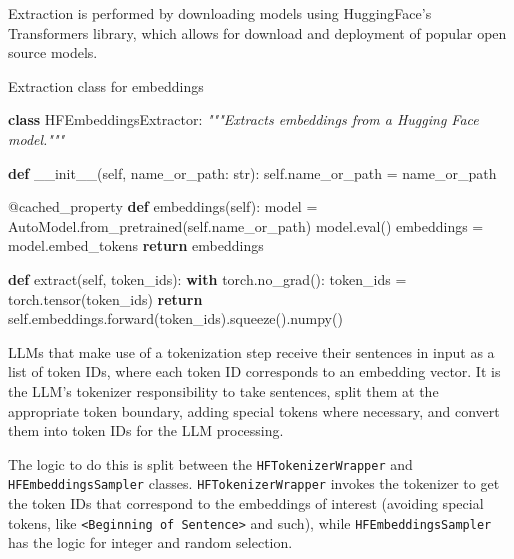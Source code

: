 \documentclass[
  a4paper, twoside, 10pt, titlepage]{book}
\newenvironment{Shaded}{}{}
\newcommand{\AttributeTok}[1]{\textcolor[rgb]{0.49,0.56,0.16}{#1}}
\newcommand{\BuiltInTok}[1]{\textcolor[rgb]{0.00,0.50,0.00}{#1}}
\newcommand{\CommentTok}[1]{\textcolor[rgb]{0.38,0.63,0.69}{\textit{#1}}}
\newcommand{\ControlFlowTok}[1]{\textcolor[rgb]{0.00,0.44,0.13}{\textbf{#1}}}
\newcommand{\FunctionTok}[1]{\textcolor[rgb]{0.02,0.16,0.49}{#1}}
\newcommand{\KeywordTok}[1]{\textcolor[rgb]{0.00,0.44,0.13}{\textbf{#1}}}
\newcommand{\NormalTok}[1]{#1}
\newcommand{\OperatorTok}[1]{\textcolor[rgb]{0.40,0.40,0.40}{#1}}
\newcommand{\VariableTok}[1]{\textcolor[rgb]{0.10,0.09,0.49}{#1}}
\begin{document}
Extraction is performed by downloading models using HuggingFace's
Transformers library, which allows for download and deployment of
popular open source models.

\begin{codelisting}

\caption{Extraction class for embeddings}\label{lst:extractor}

\begin{Shaded}
\begin{Highlighting}[]
\KeywordTok{class}\NormalTok{ HFEmbeddingsExtractor:}
    \CommentTok{"""Extracts embeddings from a Hugging Face model."""}

    \KeywordTok{def} \FunctionTok{\_\_init\_\_}\NormalTok{(}\VariableTok{self}\NormalTok{, name\_or\_path: }\BuiltInTok{str}\NormalTok{):}
        \VariableTok{self}\NormalTok{.name\_or\_path }\OperatorTok{=}\NormalTok{ name\_or\_path}

    \AttributeTok{@cached\_property}
    \KeywordTok{def}\NormalTok{ embeddings(}\VariableTok{self}\NormalTok{):}
\NormalTok{        model }\OperatorTok{=}\NormalTok{ AutoModel.from\_pretrained(}\VariableTok{self}\NormalTok{.name\_or\_path)}
\NormalTok{        model.}\BuiltInTok{eval}\NormalTok{()}
\NormalTok{        embeddings }\OperatorTok{=}\NormalTok{ model.embed\_tokens}
        \ControlFlowTok{return}\NormalTok{ embeddings}

    \KeywordTok{def}\NormalTok{ extract(}\VariableTok{self}\NormalTok{, token\_ids):}
        \ControlFlowTok{with}\NormalTok{ torch.no\_grad():}
\NormalTok{            token\_ids }\OperatorTok{=}\NormalTok{ torch.tensor(token\_ids)}
            \ControlFlowTok{return} \VariableTok{self}\NormalTok{.embeddings.forward(token\_ids).squeeze().numpy()}
\end{Highlighting}
\end{Shaded}

\end{codelisting}

LLMs that make use of a tokenization step receive their sentences in
input as a list of token IDs, where each token ID corresponds to an
embedding vector. It is the LLM's tokenizer responsibility to take
sentences, split them at the appropriate token boundary, adding special
tokens where necessary, and convert them into token IDs for the LLM
processing.

The logic to do this is split between the \texttt{HFTokenizerWrapper}
and \texttt{HFEmbeddingsSampler} classes. \texttt{HFTokenizerWrapper}
invokes the tokenizer to get the token IDs that correspond to the
embeddings of interest (avoiding special tokens, like
\texttt{\textless{}Beginning\ of\ Sentence\textgreater{}} and such),
while \texttt{HFEmbeddingsSampler} has the logic for integer and random
selection.
\end{document}
